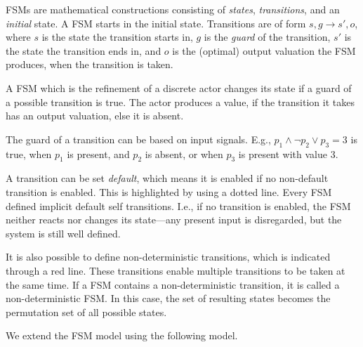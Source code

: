 \begin{definition}
    FSMs are mathematical constructions consisting of \emph{states}, \emph{transitions}, and an \emph{initial} state.
    A FSM starts in the initial state.
    Transitions are of form \(s, g \rightarrow s', o\), where \(s\) is the state the transition starts in, \(g\) is the \emph{guard} of the transition, \(s'\) is the state the transition ends in, and \(o\) is the (optimal) output valuation the FSM produces, when the transition is taken.

    A FSM which is the refinement of a discrete actor changes its state if a guard of a possible transition is true.
    The actor produces a value, if the transition it takes has an output valuation, else it is absent.

    The guard of a transition can be based on input signals.
    E.g., \(p_1 \wedge \neg p_2 \vee p_3 = 3\) is true, when \(p_1\) is present, and \(p_2\) is absent, or when \(p_3\) is present with value \(3\).

    A transition can be set \emph{default}, which means it is enabled if no non-default transition is enabled.
    This is highlighted by using a dotted line.
    Every FSM defined implicit default self transitions.
    I.e., if no transition is enabled, the FSM neither reacts nor changes its state---any present input is disregarded, but the system is still well defined.

    It is also possible to define non-deterministic transitions, which is indicated through a red line.
    These transitions enable multiple transitions to be taken at the same time.
    If a FSM contains a non-deterministic transition, it is called a non-deterministic FSM.
    In this case, the set of resulting states becomes the permutation set of all possible states.
\end{definition}

We extend the FSM model using the following model.

